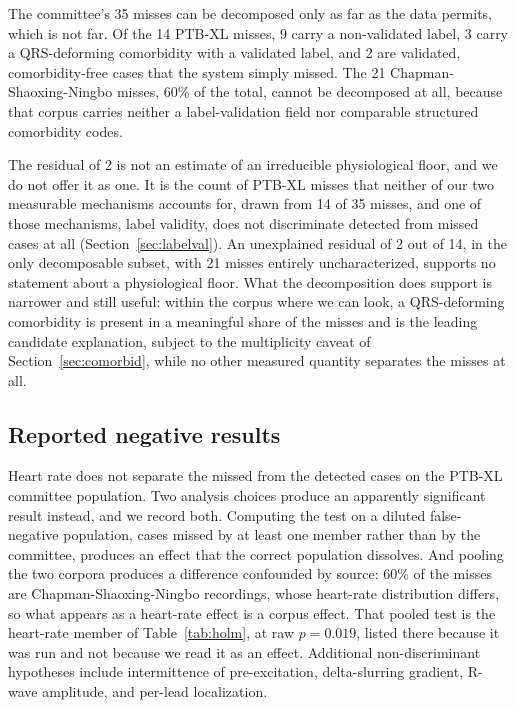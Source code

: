 \documentclass[11pt]{article}
\begin{document}
The committee's 35 misses can be decomposed only as far as the data permits, which is not far. Of the 14 PTB-XL misses, 9 carry a non-validated label, 3 carry a QRS-deforming comorbidity with a validated label, and 2 are validated, comorbidity-free cases that the system simply missed. The 21 Chapman-Shaoxing-Ningbo misses, 60\% of the total, cannot be decomposed at all, because that corpus carries neither a label-validation field nor comparable structured comorbidity codes.

The residual of 2 is not an estimate of an irreducible physiological floor, and we do not offer it as one. It is the count of PTB-XL misses that neither of our two measurable mechanisms accounts for, drawn from 14 of 35 misses, and one of those mechanisms, label validity, does not discriminate detected from missed cases at all (Section~\ref{sec:labelval}). An unexplained residual of 2 out of 14, in the only decomposable subset, with 21 misses entirely uncharacterized, supports no statement about a physiological floor. What the decomposition does support is narrower and still useful: within the corpus where we can look, a QRS-deforming comorbidity is present in a meaningful share of the misses and is the leading candidate explanation, subject to the multiplicity caveat of Section~\ref{sec:comorbid}, while no other measured quantity separates the misses at all.

\subsection{Reported negative results}
\label{sec:negresults}

Heart rate does not separate the missed from the detected cases on the PTB-XL committee population. Two analysis choices produce an apparently significant result instead, and we record both. Computing the test on a diluted false-negative population, cases missed by at least one member rather than by the committee, produces an effect that the correct population dissolves. And pooling the two corpora produces a difference confounded by source: 60\% of the misses are Chapman-Shaoxing-Ningbo recordings, whose heart-rate distribution differs, so what appears as a heart-rate effect is a corpus effect. That pooled test is the heart-rate member of Table~\ref{tab:holm}, at raw $p = 0.019$, listed there because it was run and not because we read it as an effect. Additional non-discriminant hypotheses include intermittence of pre-excitation, delta-slurring gradient, R-wave amplitude, and per-lead localization.
\end{document}

